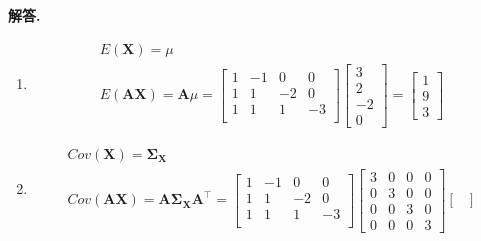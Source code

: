 \documentclass[12pt, a4paper, oneside]{ctexart}
\newenvironment{solution}{\par\noindent\textbf{解答. }}{\par}
\begin{document}
\begin{solution}
    \begin{enumerate}[label=(\alph*)]
        \item 
        \[ 
            \begin{gathered}
                E(\mathbf{X})=\mu\\
                E(\mathbf{A}\mathbf{X})=\mathbf{A}\mu=\begin{bmatrix}
                    1 & -1 & 0 & 0\\
                    1 & 1 & -2 & 0\\
                    1 & 1 & 1 & -3\\
                \end{bmatrix} \begin{bmatrix}
                    3\\
                    2\\
                    -2\\
                    0
                \end{bmatrix}=\begin{bmatrix}
                    1\\
                    9\\
                    3
                \end{bmatrix}
            \end{gathered}
        \]
        \item 
        \[
            \begin{gathered}
                Cov(\mathbf{X})=\bm{\Sigma_{X}}\\
                Cov(\mathbf{A}\mathbf{X})=\mathbf{A}\bm{\Sigma_{X}}\mathbf{A^\top}=
                \begin{bmatrix}
                    1 & -1 & 0 & 0\\
                    1 & 1 & -2 & 0\\
                    1 & 1 & 1 & -3\\
                \end{bmatrix}
                \begin{bmatrix}
                    3 & 0 & 0 & 0 \\
                    0 & 3 & 0 & 0 \\
                    0 & 0 & 3 & 0 \\
                    0 & 0 & 0 & 3
                \end{bmatrix}
                \begin{bmatrix}

\end{bmatrix}
\end{gathered}\]
\end{enumerate}
\end{solution}
\end{document}
